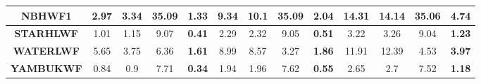 \begin{table}
\begin{tabular}{|l|l|l|l|l|l|l|l|l|l|l|l|l|}
\multicolumn{1}{|c|}{\textbf{NBHWF1}} & \multicolumn{1}{|c|}{2.97} & \multicolumn{1}{|c|}{3.34} & \multicolumn{1}{|c|}{35.09} & \multicolumn{1}{|c|}{\textbf{1.33}} & \multicolumn{1}{|c|}{9.34} & \multicolumn{1}{|c|}{10.1} & \multicolumn{1}{|c|}{35.09} & \multicolumn{1}{|c|}{\textbf{2.04}} & \multicolumn{1}{|c|}{14.31} & \multicolumn{1}{|c|}{14.14} & \multicolumn{1}{|c|}{35.06} & \multicolumn{1}{|c|}{\textbf{4.74}} \\ \hline
\multicolumn{1}{|c|}{\textbf{STARHLWF}} & \multicolumn{1}{|c|}{1.01} & \multicolumn{1}{|c|}{1.15} & \multicolumn{1}{|c|}{9.07} & \multicolumn{1}{|c|}{\textbf{0.41}} & \multicolumn{1}{|c|}{2.29} & \multicolumn{1}{|c|}{2.32} & \multicolumn{1}{|c|}{9.05} & \multicolumn{1}{|c|}{\textbf{0.51}} & \multicolumn{1}{|c|}{3.22} & \multicolumn{1}{|c|}{3.26} & \multicolumn{1}{|c|}{9.04} & \multicolumn{1}{|c|}{\textbf{1.23}} \\ \hline
\multicolumn{1}{|c|}{\textbf{WATERLWF}} & \multicolumn{1}{|c|}{5.65} & \multicolumn{1}{|c|}{3.75} & \multicolumn{1}{|c|}{6.36} & \multicolumn{1}{|c|}{\textbf{1.61}} & \multicolumn{1}{|c|}{8.99} & \multicolumn{1}{|c|}{8.57} & \multicolumn{1}{|c|}{3.27} & \multicolumn{1}{|c|}{\textbf{1.86}} & \multicolumn{1}{|c|}{11.91} & \multicolumn{1}{|c|}{12.39} & \multicolumn{1}{|c|}{4.53} & \multicolumn{1}{|c|}{\textbf{3.97}} \\ \hline
\multicolumn{1}{|c|}{\textbf{YAMBUKWF}} & \multicolumn{1}{|c|}{0.84} & \multicolumn{1}{|c|}{0.9} & \multicolumn{1}{|c|}{7.71} & \multicolumn{1}{|c|}{\textbf{0.34}} & \multicolumn{1}{|c|}{1.94} & \multicolumn{1}{|c|}{1.96} & \multicolumn{1}{|c|}{7.62} & \multicolumn{1}{|c|}{\textbf{0.55}} & \multicolumn{1}{|c|}{2.65} & \multicolumn{1}{|c|}{2.7} & \multicolumn{1}{|c|}{7.52} & \multicolumn{1}{|c|}{\textbf{1.18}} \\ \hline

\end{tabular}
\label{tab:mae_result_minor_au}
\end{table}